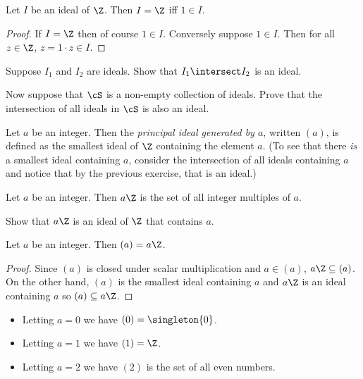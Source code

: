 \documentclass[oneside,12pt]{amsart}
\begin{document}
\begin{lemma}
Let $I$ be an ideal of $\Z$. Then $I=\Z$ iff $1\in I$.
\end{lemma}
\begin{proof}
If $I=\Z$ then of course $1\in I$. Conversely suppose $1\in I$. Then for
all $z\in\Z$, $z=1\cdot z \in I$.
\end{proof}

\begin{homework}
Suppose $I_1$ and $I_2$ are ideals. Show that $I_1\intersect I_2$ is an ideal.

Now suppose that $\cS$ is a non-empty collection of ideals. Prove that the intersection
of all ideals in $\cS$ is also an ideal.
\end{homework}

\begin{definition}
Let $a$ be an integer. Then the \emph{principal ideal generated by $a$},
written $(a)$, is defined as the smallest ideal of $\Z$ containing the element $a$.
(To see that there \emph{is} a smallest ideal containing $a$, consider the
intersection of all ideals containing $a$ and notice that by the previous
exercise, that is an ideal.)
\end{definition}

\begin{definition}
Let $a$ be an integer. Then $a\Z$ is the set of all integer multiples of $a$.
\end{definition}

\begin{homework}
Show that $a\Z$ is an ideal of $\Z$ that contains $a$.
\end{homework}

\begin{lemma}
Let $a$ be an integer. Then $(a)=a\Z$.
\end{lemma}
\begin{proof}
Since $(a)$ is closed under
scalar multiplication and $a\in (a)$, $a\Z\subseteq (a)$. On the other hand,
$(a)$ is the smallest ideal containing $a$ and $a\Z$ is an ideal containing
$a$ so $(a)\subseteq a\Z$.
\end{proof}

\begin{in_class_example}
\quad
\begin{itemize}
\item Letting $a=0$ we have $(0)=\singleton{0}$.
\item Letting $a=1$ we have $(1) = \Z$.
\item Letting $a=2$ we have $(2)$ is the set of all even numbers.
\end{itemize}
\end{in_class_example}
\end{document}
